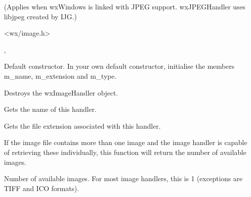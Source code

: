 (Applies when wxWindows is linked with JPEG support. wxJPEGHandler uses libjpeg
created by IJG.)




<wx/image.h>


, 


\label{wximagehandlerconstr}


Default constructor. In your own default constructor, initialise the members
m\_name, m\_extension and m\_type.



Destroys the wxImageHandler object.



Gets the name of this handler.



Gets the file extension associated with this handler.

\label{wximagehandlergetimagecount}


If the image file contains more than one image and the image handler is capable 
of retrieving these individually, this function will return the number of
available images.



Number of available images. For most image handlers, this is 1 (exceptions
are TIFF and ICO formats).


